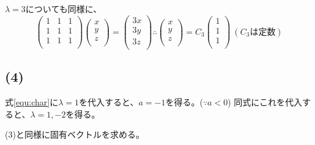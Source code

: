 \documentclass[]{jsarticle}
\begin{document}
        $\lambda = 3$についても同様に、
        \begin{equation*}
            \begin{pmatrix}
                1 & 1 & 1 \\
                1 & 1 & 1 \\
                1 & 1 & 1 \\
            \end{pmatrix}
            \begin{pmatrix}
                x \\
                y \\
                z \\
            \end{pmatrix} =
            \begin{pmatrix}
                3x \\
                3y \\
                3z \\
            \end{pmatrix}
            \therefore
            \begin{pmatrix}
                x \\
                y \\
                z \\
            \end{pmatrix} =
            C_3\begin{pmatrix}
                1 \\
                1 \\
                1 \\
            \end{pmatrix} \
            (C_3は定数)
        \end{equation*}
    \subsection*{(4)}
        式\ref{equ:char}に$\lambda = 1$を代入すると、$a = -1$を得る。($\because a < 0$)
        同式にこれを代入すると、$\lambda = 1, -2$を得る。

        (3)と同様に固有ベクトルを求める。
\end{document}
